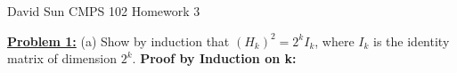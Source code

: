 \documentclass[11pt]{article}
\begin{document}
\begin{flushleft}
	David Sun 	\newline
	CMPS 102	\newline
	Homework 3	\newline
	
	\item \textbf {\underline{Problem 1:}} \newline
	(a) Show by induction that $(H_k)^2=2^k I_k$, where
	$I_k$ is the identity matrix of dimension $2^k$. 
	\newline
	\textbf {Proof by Induction on k:} \newline
	
	
	
\end{flushleft}
\end{document}
